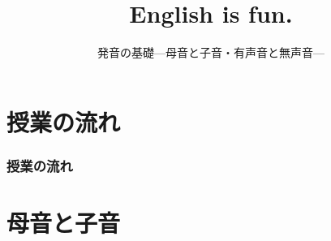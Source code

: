 \documentclass[aspectratio=169,xcolor={dvipsnames,table}]{beamer}
\title{English is fun.}
\subtitle{発音の基礎---母音と子音・有声音と無声音---}
\author{}
\institute[]{}
\date[]
\begin{document}
\begin{frame}[label=title]
\thispagestyle{empty}
\titlepage
\end{frame}
%
%
%
%
%
%
%
%
%
\section*{授業の流れ}
\begin{frame}[plain]
  \frametitle{授業の流れ}
  \tableofcontents
\end{frame}
\section{母音と子音}
\end{document}

